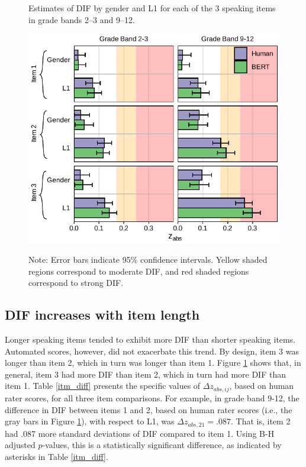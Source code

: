 \documentclass [PhD] {uclathes}
\begin{document}
\begin{figure}[h]
    \centering
    \caption{Estimates of DIF by gender and L1 for each of the 3 speaking items in grade bands 2–3 and 9–12.}    
    \includegraphics[width=5in]{figures/20230504_ETS-DIF_BERT_zabs_itm_edit.pdf}
    \label{fig:zabs_itm}
\caption*{\small Note: Error bars indicate 95\% confidence intervals. Yellow shaded regions correspond to moderate DIF, and red shaded regions correspond to strong DIF.}
\end{figure}

\subsection{DIF increases with item length}

Longer speaking items tended to exhibit more DIF than shorter speaking items. Automated scores, however, did not exacerbate this trend. By design, item 3 was longer than item 2, which in turn was longer than item 1. Figure \ref{fig:zabs_itm} shows that, in general, item 3 had more DIF than item 2, which in turn had more DIF than item 1. Table \ref{itm_diff} presents the specific values of $\Delta z_{abs,ij}$, based on human rater scores, for all three item comparisons. For example, in grade band 9-12, the difference in DIF between items 1 and 2, based on human rater scores (i.e., the gray bars in Figure \ref{fig:zabs_itm}), with respect to L1, was $\Delta z_{abs, 21} = .087$. That is, item 2 had .087 more standard deviations of DIF compared to item 1. Using B-H adjusted $p$-values, this is a statistically significant difference, as indicated by asterisks in Table \ref{itm_diff}. 
\end{document}
